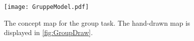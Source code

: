 %
\newpage
%
\begin{figure}[H]
	\centering
	\texttt{[image: GruppeModel.pdf]}
	\caption{The concept map for the group task. The hand-drawn map is displayed in \autoref{fig:GroupDraw}.}
	\label{fig:GroupConceptMap}
\end{figure}
%


























